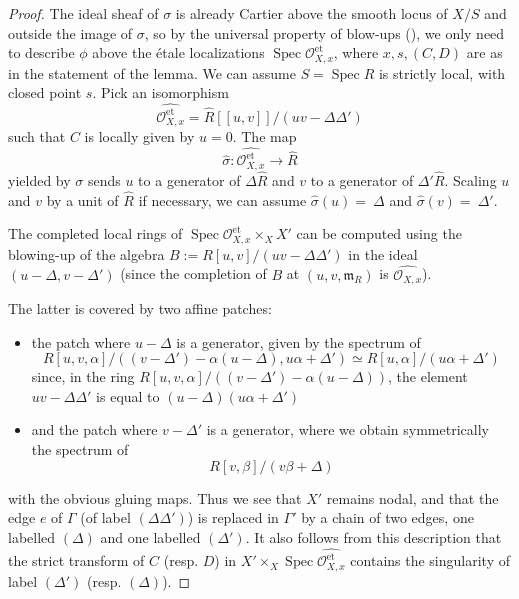 \documentclass[a4paper,10pt,twoside]{article}
\newcommand{\ra}{\rightarrow}
\newcommand{\on}[1]{\operatorname{#1}}
\renewcommand{\O}{\mathcal{O}}
\newcommand{\m}{\mathfrak{m}}
\DeclareMathOperator{\spec}{Spec}
\theoremstyle{definition}
\theoremstyle{remark}
\renewcommand{\on}[1]{\operatorname{#1}}
\begin{document}
\begin{proof}
The ideal sheaf of $\sigma$ is already Cartier above the smooth locus of $X/S$ and outside the image of $\sigma$, so by the universal property of blow-ups (\cite[\href{https://stacks.math.columbia.edu/tag/0806}{Tag 0806}]{stacks-project}), we only need to describe $\phi$ above the  \'etale localizations $\spec\O_{X,x}^{\on{et}}$, where $x,s,(C,D)$ are as in the statement of the lemma. We can assume $S=\spec R$ is strictly local, with closed point $s$. Pick an isomorphism
\[
\widehat{\O_{X,x}^{\on{et}}}=\widehat{R}[[u,v]]/(uv-\Delta\Delta')
\]
such that $C$ is locally given by $u=0$. The map
\[
\widehat{\sigma}\colon\widehat{\O_{X,x}^{\on{et}}}\ra\widehat{R}
\]
yielded by $\sigma$ sends $u$ to a generator of $\Delta \widehat R$ and $v$ to a generator of $\Delta' \widehat R$. Scaling $u$ and $v$ by a unit of $\widehat R$ if necessary, we can assume $\widehat{\sigma}(u)=~\Delta$ and $\widehat{\sigma}(v)=~\Delta'$.

The completed local rings of $\spec \O_{X,x}^{\on{et}}\times_X X'$ can be computed using the blowing-up of the algebra $B:=R[u,v]/(uv-\Delta\Delta')$ in the ideal $(u-\Delta,v-\Delta')$ (since the completion of $B$ at $(u,v,\m_R)$ is $\widehat{\O_{X,x}}$).
	
	The latter is covered by two affine patches:
	
	\begin{itemize} 
	
	\item the patch where $u-\Delta$ is a generator, given by the spectrum of
	\[
	R[u,v,\alpha]/((v-\Delta')-\alpha(u-\Delta),u\alpha+\Delta')\simeq R[u,\alpha]/(u\alpha+\Delta')
	\]
	since, in the ring $R[u,v,\alpha]/((v-\Delta')-\alpha(u-\Delta))$, the element $uv-\Delta\Delta'$ is equal to $(u-\Delta)(u\alpha+\Delta')$
	
	\item and the patch where $v-\Delta'$ is a generator, where we obtain symmetrically the spectrum of
	\[
	R[v,\beta]/(v\beta+\Delta)
	\]
	\end{itemize}
	with the obvious gluing maps. Thus we see that $X'$ remains nodal, and that the edge $e$ of $\Gamma$ (of label $(\Delta\Delta')$) is replaced in $\Gamma'$ by a chain of two edges, one labelled $(\Delta)$ and one labelled $(\Delta')$. It also follows from this description that the strict transform of $C$ (resp. $D$) in $X'\times_X \spec\widehat{\O_{X,x}^{\on{et}}}$ contains the singularity of label $(\Delta')$ (resp. $(\Delta)$).
\end{proof}
\end{document}

